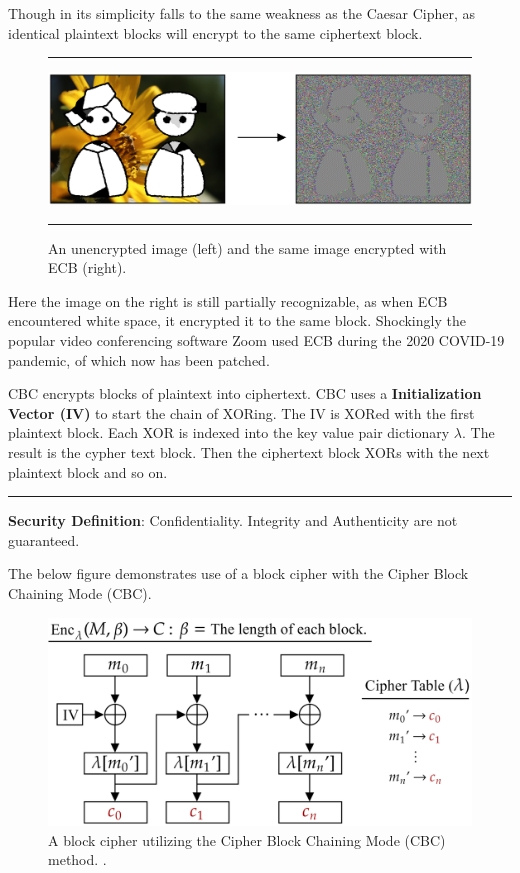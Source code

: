 \noindent
Though in its simplicity falls to the same weakness as the Caesar Cipher, as identical plaintext blocks will encrypt to the same ciphertext block.

\begin{figure}[h!]
    \centering
    \rule{\textwidth}{0.4pt}

    \vspace{1em}
    \includegraphics[width=.8\textwidth]{Sections/sec/enc/ecb.png}
    \rule{\textwidth}{0.4pt}
    \caption{An unencrypted image (left) and the same image encrypted with ECB (right).}
    \label{fig:block_cipher}
\end{figure}

\noindent
Here the image on the right is still partially recognizable, as when ECB encountered white space, it encrypted it to the same block.
Shockingly the popular video conferencing software Zoom used ECB during the 2020 COVID-19 pandemic, of which now has been patched.

\vspace{1em}
\begin{Def}

    \label{theo:cipher_block_chaining}
    CBC encrypts blocks of plaintext into ciphertext. CBC uses a \textbf{Initialization Vector (IV)} to start the chain of XORing.
    The IV is XORed with the first plaintext block. Each XOR is indexed into the key value pair dictionary $\lambda$. The result is the cypher text block.
    Then the ciphertext block XORs with the next plaintext block and so on. \hfill \cite{nist80038a}\\
    \noindent
    \rule{\textwidth}{0.4pt}
    \textbf{Security Definition}: Confidentiality. Integrity and Authenticity are not guaranteed.
\end{Def}

\newpage 

\noindent
The below figure demonstrates use of a block cipher with the Cipher Block Chaining Mode (CBC).

\begin{figure}[h!]
    \centering
    \includegraphics[width=.8\textwidth]{Sections/sec/enc/cbc.png}
    \caption{A block cipher utilizing the Cipher Block Chaining Mode (CBC) method. \cite{essex2024encrypting}.}
    \label{fig:block_cipher}
\end{figure}

